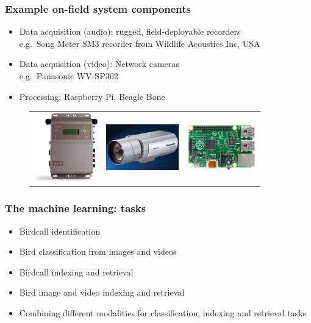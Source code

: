 \documentclass[mathserif]{beamer}
\begin{document}
\begin{frame}
\frametitle{Example on-field system components}
\vspace{-1cm}
\vspace{0.3cm}
\begin{itemize}
\item Data acquisition (audio): rugged, field-deployable recorders \\
e.g.~Song Meter SM3 recorder from Wildlife Acoustics Inc, USA \\
\item Data acquisition (video): Network cameras \\
e.g.~Panasonic WV-SP302\\
\item Processing: Raspberry Pi, Beagle Bone 
\end{itemize}
\begin{figure}
	\begin{tabular}{c c c}
	\includegraphics[height=3cm]{figures/songMeter.png}&
	\includegraphics[height=2cm]{figures/pan_cam.png}&
	\includegraphics[height=2cm]{figures/rasp.jpg}
	\end{tabular}
	\end{figure}
\end{frame}


\begin{frame}
\frametitle{The machine learning: tasks}
\begin{itemize}
\item<2-> Birdcall identification 
\item<3-> Bird classification from images and videos
\item<4-> Birdcall indexing and retrieval
\item<5-> Bird image and video indexing and retrieval
\item<6-> Combining different modalities for classification, indexing and retrieval tasks
\end{itemize}
\end{frame}
\end{document}
